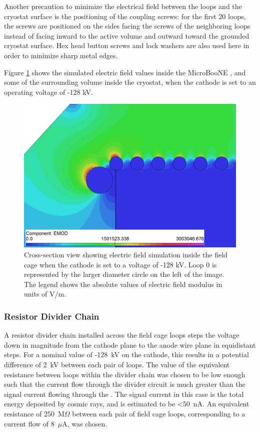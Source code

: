 Another precaution to minimize the electrical field between the loops and the cryostat surface is the positioning of the coupling screws: for the first 20 loops, the screws are positioned on the sides facing the screws of the neighboring loops instead of facing inward to the \lartpc active volume and outward toward the grounded cryostat surface. Hex head button screws and lock washers are also used here in order to minimize sharp metal edges.

Figure \ref{fig:efield} shows the simulated electric field values inside the MicroBooNE \lartpc, and some of the surrounding volume inside the cryostat, when the cathode is set to an operating voltage of -128 kV.  

\begin{figure}[htb]
\centering	
\includegraphics[width=0.7\linewidth]{figures/efield.png}
\caption{Cross-section view showing electric field simulation inside the field cage when the cathode is set to a voltage of -128 kV.  Loop 0 is represented by the larger diameter circle on the left of the image.  The legend shows the absolute values of electric field modulus in units of V/m.}
\label{fig:efield}
\end{figure}



\subsubsection{Resistor Divider Chain}

A resistor divider chain installed across the field cage loops steps the voltage down in magnitude from the cathode plane to the anode wire plane in equidistant steps.  For a nominal value of -128~kV on the cathode, this results in a potential difference of 2~kV between each pair of loops. The value of the equivalent resistance between loops within the divider chain was chosen to be low enough such that the current flow through the divider circuit is much greater than the signal current flowing through the \lartpc. The signal current in this case is the total energy deposited by cosmic rays, and is estimated to be <50~nA. An equivalent resistance of 250~M$\Omega$ between each pair of field cage loops, corresponding to a current flow of 8~$\mu$A, was chosen.  

